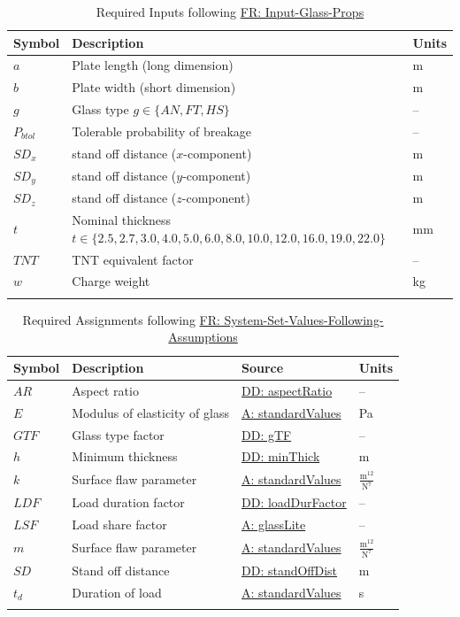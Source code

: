 \documentclass[12pt]{article}
\begin{document}
\begin{longtabu}{l X[l] l}
\toprule
Symbol & Description & Units
\\
\midrule
\endhead
$a$ & Plate length (long dimension) & m
\\
$b$ & Plate width (short dimension) & m
\\
$g$ & Glass type $g\in{}\{AN,FT,HS\}$ & --
\\
${P_{btol}}$ & Tolerable probability of breakage & --
\\
${SD_{x}}$ & stand off distance ($x$-component) & m
\\
${SD_{y}}$ & stand off distance ($y$-component) & m
\\
${SD_{z}}$ & stand off distance ($z$-component) & m
\\
$t$ & Nominal thickness $t\in{}\{2.5,2.7,3.0,4.0,5.0,6.0,8.0,10.0,12.0,16.0,19.0,22.0\}$ & mm
\\
$TNT$ & TNT equivalent factor & --
\\
$w$ & Charge weight & kg
\\
\bottomrule
\caption{Required Inputs following \hyperref[inputGlassProps]{FR: Input-Glass-Props}}
\label{Table:ReqInputs}
\end{longtabu}
\begin{longtable}{l l l l}
\toprule
Symbol & Description & Source & Units
\\
\midrule
\endhead
$AR$ & Aspect ratio & \hyperref[DD:aspectRatio]{DD: aspectRatio} & --
\\
$E$ & Modulus of elasticity of glass & \hyperref[assumpSV]{A: standardValues} & Pa
\\
$GTF$ & Glass type factor & \hyperref[DD:gTF]{DD: gTF} & --
\\
$h$ & Minimum thickness & \hyperref[DD:minThick]{DD: minThick} & m
\\
$k$ & Surface flaw parameter & \hyperref[assumpSV]{A: standardValues} & $\frac{\text{m}^{12}}{\text{N}^{7}}$
\\
$LDF$ & Load duration factor & \hyperref[DD:loadDurFactor]{DD: loadDurFactor} & --
\\
$LSF$ & Load share factor & \hyperref[assumpGL]{A: glassLite} & --
\\
$m$ & Surface flaw parameter & \hyperref[assumpSV]{A: standardValues} & $\frac{\text{m}^{12}}{\text{N}^{7}}$
\\
$SD$ & Stand off distance & \hyperref[DD:standOffDist]{DD: standOffDist} & m
\\
${t_{d}}$ & Duration of load & \hyperref[assumpSV]{A: standardValues} & s
\\
\bottomrule
\caption{Required Assignments following \hyperref[sysSetValsFollowingAssumps]{FR: System-Set-Values-Following-Assumptions}}
\label{Table:ReqAssignments}
\end{longtable}
\end{document}
